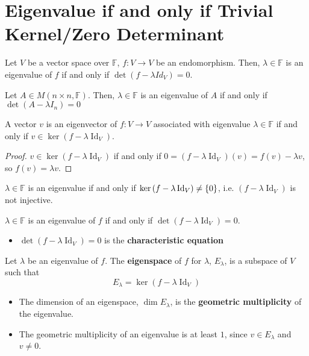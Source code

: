 \documentclass[letterpaper,12pt]{article}
\begin{document}
\section*{Eigenvalue if and only if Trivial Kernel/Zero Determinant}
\begin{theorem}
Let $V$ be a vector space over $\mathbb{F}$, $f: V \rightarrow V$ be an endomorphism. Then, $\lambda \in \mathbb{F}$ is an eigenvalue of $f$ if and only if $\det{(f - \lambda Id_{V})} = 0$.
\end{theorem}

\begin{theorem}
Let $A \in M(n \times n, \mathbb{F})$. Then, $\lambda \in \mathbb{F}$ is an eigenvalue of $A$ if and only if $\det{(A - \lambda I_n)} = 0$
\end{theorem}

\begin{corollary}
A vector $v$ is an eigenvector of $f: V \rightarrow V$ associated with eigenvalue $\lambda \in \mathbb{F}$ if and only if $v \in \ker{(f - \lambda \operatorname{Id}_{V})}$.
\end{corollary}
\begin{proof}
$v \in \ker{(f - \lambda \operatorname{Id}_{V})}$ if and only if $0 = (f - \lambda \operatorname{Id}_{V})(v) = f(v) - \lambda v$, so $f(v) = \lambda v$.
\end{proof}

\begin{corollary}
$\lambda \in \mathbb{F}$ is an eigenvalue if and only if $\ker{(f - \lambda \operatorname{Id}_{V})} \neq \left\{ 0 \right\}$, i.e. $(f - \lambda \operatorname{Id}_{V})$ is not injective.
\end{corollary}

\begin{corollary}
$\lambda \in \mathbb{F}$ is an eigenvalue of $f$ if and only if $\det{(f - \lambda \operatorname{Id}_{V})} = 0$.
\begin{itemize}
    \item $\det{(f - \lambda \operatorname{Id}_{V})} = 0$ is the \textbf{characteristic equation}
\end{itemize}
\end{corollary}

\begin{definition}
Let $\lambda$ be an eigenvalue of $f$. The \textbf{eigenspace} of $f$ for $\lambda$, $E_{\lambda}$, is a subspace of $V$ such that
\begin{equation*}
    E_{\lambda} = \ker{(f - \lambda \operatorname{Id}_V)}
\end{equation*}
\begin{itemize}
    \item The dimension of an eigenspace, $\dim{E_{\lambda}}$, is the \textbf{geometric multiplicity} of the eigenvalue.
    \item The geometric multiplicity of an eigenvalue is at least $1$, since $v \in E_{\lambda}$ and $v \neq 0$.
\end{itemize}
\end{definition}
\end{document}
